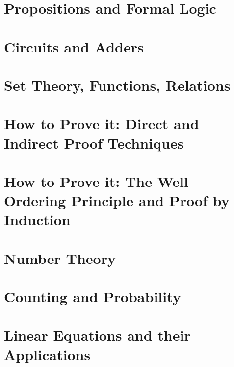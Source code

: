 



\frontmatter
\tableofcontents*

\mainmatter

\chapter{Propositions and Formal Logic}


\chapter{Circuits and Adders}


\chapter{Set Theory, Functions, Relations}


\chapter{How to Prove it: Direct and Indirect Proof Techniques}


\chapter{How to Prove it: The Well Ordering Principle and Proof by Induction}


\chapter{Number Theory}


\chapter{Counting and Probability}


\chapter{Linear Equations and their Applications}


\backmatter
{}
\nocite{*}


